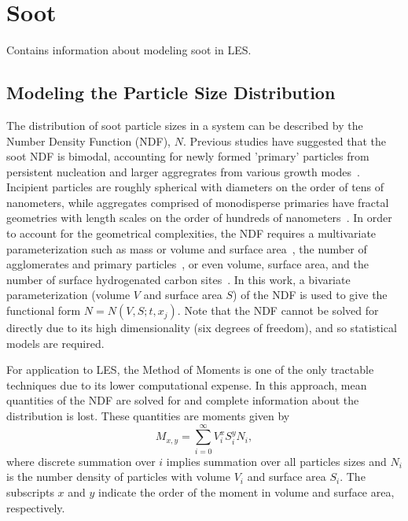 \section{Soot}
\label{sec:lesmodels:soot}

Contains information about modeling soot in LES.


\subsection{Modeling the Particle Size Distribution}
\label{sec:lesmodels:soot:ndf}

The distribution of soot particle sizes in a system can be described by the Number Density Function (NDF), $N$. Previous studies have suggested that the soot NDF is bimodal, accounting for newly formed 'primary' particles from persistent nucleation and larger aggregrates from various growth modes~\cite{zhao2003,zhao2005,netzell2007}. Incipient particles are roughly spherical with diameters on the order of tens of nanometers, while aggregates comprised of monodisperse primaries have fractal geometries with length scales on the order of hundreds of nanometers~\cite{vanderwal1999}. In order to account for the geometrical complexities, the NDF requires a multivariate parameterization such as mass or volume and surface area~\cite{patterson2007,mueller2009,hmom2009}, the number of agglomerates and primary particles~\cite{park2004}, or even volume, surface area, and the number of surface hydrogenated carbon sites~\cite{blanquart2009}. In this work, a bivariate parameterization (volume $V$ and surface area $S$) of the NDF is used to give the functional form $N = N(V, S; t, x_j)$. Note that the NDF cannot be solved for directly due to its high dimensionality (six degrees of freedom), and so statistical models are required.

For application to LES, the Method of Moments is one of the only tractable techniques due to its lower computational expense. In this approach, mean quantities of the NDF are solved for and complete information about the distribution is lost. These quantities are moments given by
\begin{equation}\label{eq:lesmodels:soot:ndf:moments}
  M_{x,y} = \sum\limits_{i=0}^\infty V_i^x S_i^y N_i,
\end{equation}
where discrete summation over $i$ implies summation over all particles sizes and $N_i$ is the number density of particles with volume $V_i$ and surface area $S_i$. The subscripts $x$ and $y$ indicate the order of the moment in volume and surface area, respectively.

